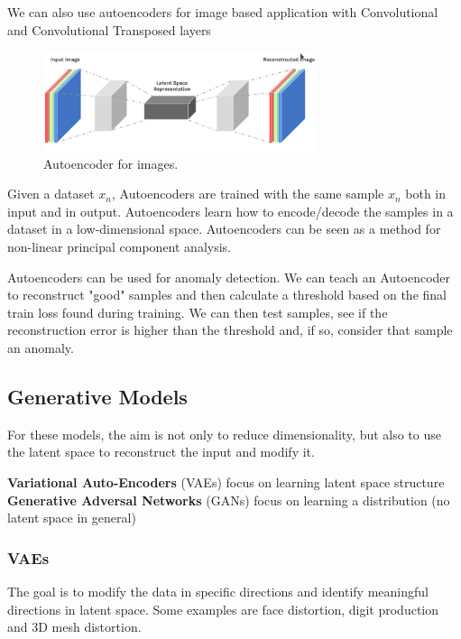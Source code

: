 We can also use autoencoders for image based application with Convolutional and Convolutional Transposed layers
\begin{figure}[H]
    \centering
    \includegraphics[width=8cm]{images/DimRed/autoencoder-image.png}
    \caption{Autoencoder for images.}
    \label{fig:non-linear-manifold}
\end{figure}
Given a dataset ${x_{n}}$, Autoencoders are trained with the same sample $x_{n}$ both in input and in output. Autoencoders learn how to encode/decode the samples in a dataset in a low-dimensional space. Autoencoders can be seen as a method for non-linear principal component analysis.

Autoencoders can be used for anomaly detection. We can teach an Autoencoder to reconstruct "good" samples and then calculate a threshold based on the final train loss found during training. We can then test samples, see if the reconstruction error is higher than the threshold and, if so, consider that sample an anomaly.

\subsection{Generative Models}
For these models, the aim is not only to reduce dimensionality, but also to use the latent space to reconstruct the input and modify it.

\textbf{Variational Auto-Encoders} (VAEs) focus on learning latent space structure\\
\textbf{Generative Adversal Networks} (GANs) focus on learning a distribution (no latent space in general)

\subsubsection{VAEs}
The goal is to modify the data in specific directions and identify meaningful directions in latent space. Some examples are face distortion, digit production and 3D mesh distortion.

